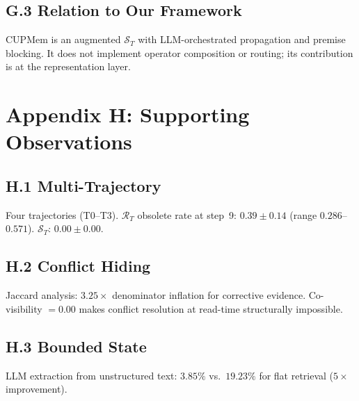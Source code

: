 \documentclass[letterpaper,twocolumn,10pt]{article}
\begin{document}
\subsection*{G.3 Relation to Our Framework}
CUPMem is an augmented $\mathcal{S}_T$ with LLM-orchestrated propagation and premise blocking. It does not implement operator composition or routing; its contribution is at the representation layer.

\section*{Appendix H: Supporting Observations}
\subsection*{H.1 Multi-Trajectory}
Four trajectories (T0--T3). $\mathcal{R}_T$ obsolete rate at step~9: $0.39\pm0.14$ (range $0.286$--$0.571$). $\mathcal{S}_T$: $0.00\pm0.00$.

\subsection*{H.2 Conflict Hiding}
Jaccard analysis: $3.25\times$ denominator inflation for corrective evidence. Co-visibility $=0.00$ makes conflict resolution at read-time structurally impossible.

\subsection*{H.3 Bounded State}
LLM extraction from unstructured text: $3.85\%$ vs.\ $19.23\%$ for flat retrieval ($5\times$ improvement).



\end{document}
